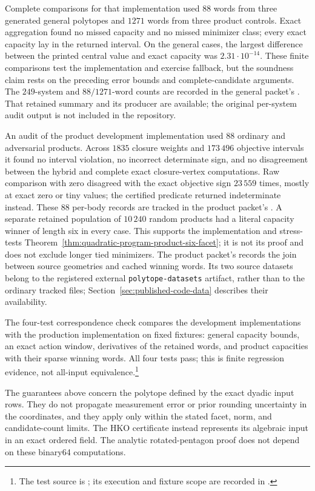 Complete comparisons for that implementation used \(88\) words from three
generated general polytopes and \(1271\) words from three product controls. Exact aggregation
found no missed capacity and no missed minimizer class; every exact capacity
lay in the returned interval.  On the general cases, the largest difference
between the printed central value and exact capacity was \(2.31\cdot10^{-14}\).
These finite comparisons test the implementation and exercise fallback, but
the soundness claim rests on the preceding error bounds and complete-candidate
arguments. The \(249\)-system and \(88/1271\)-word counts are recorded in
the general packet's . That retained summary and its
producer are available; the original per-system audit output is not
included in the repository.

An audit of the product development implementation used \(88\) ordinary and
adversarial products. Across
\(1835\) closure weights and \(173\,496\) objective intervals it found no
interval violation, no incorrect determinate sign, and no disagreement between
the hybrid and complete exact closure-vertex computations.  Raw comparison
with zero disagreed with the exact objective sign \(23\,559\) times, mostly at
exact zero or tiny values; the certified predicate returned indeterminate
instead. These \(88\) per-body records are tracked in the product packet's
. A separate retained population of \(10\,240\) random products had a
literal capacity winner of length six in every case.  This supports the
implementation and stress-tests
Theorem~\ref{thm:quadratic-program-product-six-facet}; it is not its proof and
does not exclude longer tied minimizers.
The product packet's  records the join between source
geometries and cached winning words. Its two source datasets belong to the
registered external \texttt{polytope-datasets} artifact, rather than to the
ordinary tracked files; Section~\ref{sec:published-code-data} describes their
availability.

The four-test correspondence check compares the development implementations
with the production implementation on fixed fixtures: general capacity bounds,
an exact action window, derivatives of the retained words, and product capacities
with their sparse winning words. All four tests pass; this is finite regression
evidence, not all-input equivalence.\footnote{The test source is
;
its execution and fixture scope are recorded in
.}

The guarantees above concern the polytope defined by the exact dyadic input
rows.  They do not propagate measurement error or prior rounding uncertainty
in the coordinates, and they apply only within the stated facet, norm, and
candidate-count limits.  The HKO certificate instead represents its algebraic input in an exact
ordered field.  The analytic rotated-pentagon proof does not depend on
these binary64 computations.
